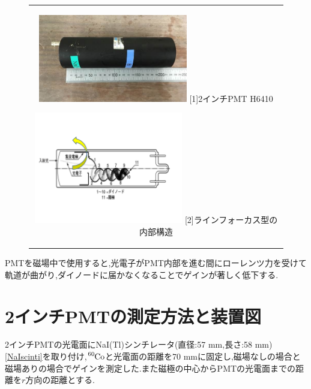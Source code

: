 \begin{figure}[h]
  \begin{center}
    \begin{tabular}{c}
      \begin{minipage}[t]{0.5\hsize}    
        \begin{center}
          \includegraphics[width=6.5cm]{fig/iguchi/PMTphoto.jpg}
	\hspace{1cm}[1]2インチPMT H6410
     \end{center}
    \end{minipage}
      \begin{minipage}[t]{0.5\hsize}    
        \begin{center}
          \includegraphics[width=6.5cm]{fig/iguchi/PMTinner.pdf}
         \hspace{2cm}[2]ラインフォーカス型の内部構造
         \end{center}
        \end{minipage}
     
     \end{tabular}
     \label{PMT12}
    \end{center}
 \end{figure}

PMTを磁場中で使用すると,光電子がPMT内部を進む間にローレンツ力を受けて軌道が曲がり,ダイノードに届かなくなることでゲインが著しく低下する.

\section{2インチPMTの測定方法と装置図}
2インチPMTの光電面にNaI(Tl)シンチレータ(直径:57 mm,長さ:58 mm)\ref{NaIscinti}を取り付け,$\ce{^{60}Co}$と光電面の距離を70 mmに固定し,磁場なしの場合と磁場ありの場合でゲインを測定した.また磁極の中心からPMTの光電面までの距離を$r$方向の距離とする.
 
